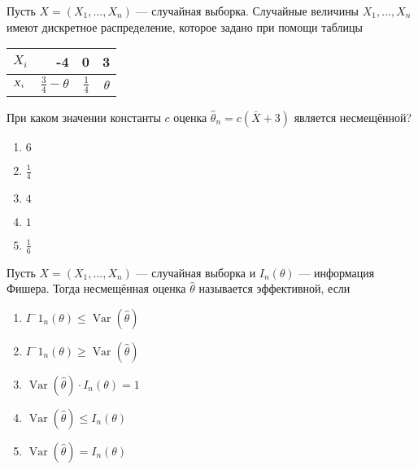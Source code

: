 \documentclass[t]{beamer}
\DeclareMathOperator{\Var}{Var}
\let\P\relax
\DeclareMathOperator{\P}{\mathbb{P}}
\begin{document}
 \begin{frame} \label{48} 
\begin{block}{48} 

Пусть $X = (X_1, \ldots , X_n)$ — случайная выборка. Случайные величины $X_1, ... , X_n$ имеют дискретное распределение, которое задано при помощи таблицы

\begin{center}
\begin{tabular}{lrrr} \toprule
$X_i$  & -4 & 0 & 3 \\
\midrule
$\P_{X_i}$ & $\frac{3}{4} - \theta$ & $\frac{1}{4}$ & $\theta$\\
\bottomrule
\end{tabular}
\end{center}

При каком значении константы $c$ оценка  $\hat{\theta}_n = c (\bar{X} + 3)$ является несмещённой?
  


 \end{block} 
\begin{enumerate} 
\item[] \hyperlink{48-No}{\beamergotobutton{} $6$}
\item[] \hyperlink{48-No}{\beamergotobutton{} $\frac{1}{4}$}
\item[] \hyperlink{48-No}{\beamergotobutton{} $4$}
\item[] \hyperlink{48-No}{\beamergotobutton{} $1$}
\item[] \hyperlink{48-Yes}{\beamergotobutton{} $\frac{1}{6}$}
\end{enumerate} 
\end{frame} 


 \begin{frame} \label{49} 
\begin{block}{49} 

Пусть $X = (X_1, \ldots , X_n)$ — случайная выборка и $I_n(\theta)$ — информация Фишера. Тогда несмещённая оценка $\hat{\theta}$ называется эффективной, если
  


 \end{block} 
\begin{enumerate} 
\item[] \hyperlink{49-No}{\beamergotobutton{} $I^-1_n (\theta) \leq \Var(\hat\theta)$}
\item[] \hyperlink{49-No}{\beamergotobutton{} $I^-1_n (\theta) \geq \Var(\hat\theta)$}
\item[] \hyperlink{49-Yes}{\beamergotobutton{} $\Var(\hat\theta) \cdot I_n (\theta) = 1$}
\item[] \hyperlink{49-No}{\beamergotobutton{} $\Var(\hat\theta) \leq I_n (\theta)$}
\item[] \hyperlink{49-No}{\beamergotobutton{} $\Var(\hat\theta) = I_n (\theta)$}
\end{enumerate} 
\end{frame} 
\end{document}
